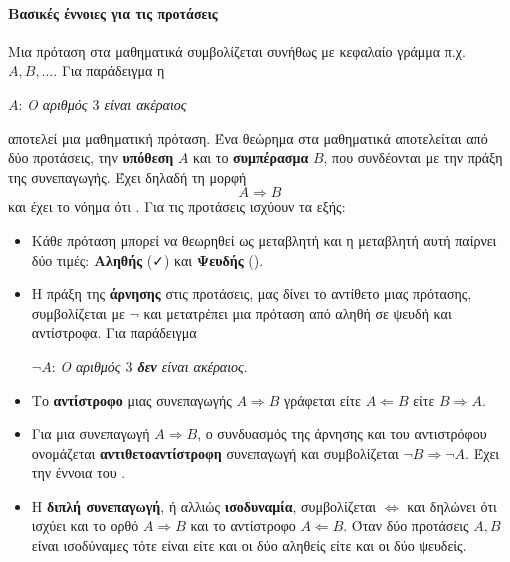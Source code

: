 \documentclass[a4paper,11pt,twoside]{article}
\begin{document}
\paragraph{Βασικές έννοιες για τις προτάσεις}
Μια πρόταση στα μαθηματικά συμβολίζεται συνήθως με κεφαλαίο γράμμα π.χ. $A,B,\ldots$. Για παράδειγμα η 
\begin{center}
$A$: \textit{Ο αριθμός $3$ είναι ακέραιος}
\end{center}
αποτελεί μια μαθηματική πρόταση. Ένα θεώρημα στα μαθηματικά αποτελείται από δύο προτάσεις, την \textbf{υπόθεση} $A$ και το \textbf{συμπέρασμα} $B$, που συνδέονται με την πράξη της συνεπαγωγής. Έχει δηλαδή τη μορφή
\[ A\Rightarrow B \]
και έχει το νόημα ότι . Για τις προτάσεις ισχύουν τα εξής:
\begin{itemize}
\item Κάθε πρόταση μπορεί να θεωρηθεί ως μεταβλητή και η μεταβλητή αυτή παίρνει δύο τιμές: \textbf{Αληθής} (\textcolor{check}{\faCheck}) και \textbf{Ψευδής} (\textcolor{error}{\faTimes}).
\item Η πράξη της \textbf{άρνησης} στις προτάσεις, μας δίνει το αντίθετο μιας πρότασης, συμβολίζεται με $\neg$ και μετατρέπει μια πρόταση από αληθή σε ψευδή και αντίστροφα. Για παράδειγμα 
\begin{center}
$\neg A$: \textit{Ο αριθμός $3$ \textbf{δεν} είναι ακέραιος}.
\end{center}
\item Το \textbf{αντίστροφο} μιας συνεπαγωγής $A\Rightarrow B$ γράφεται είτε $A\Leftarrow B$ είτε $B\Rightarrow A$.
\item Για μια συνεπαγωγή $A\Rightarrow B$, ο συνδυασμός της άρνησης και του αντιστρόφου ονομάζεται \textbf{αντιθετοαντίστροφη} συνεπαγωγή και συμβολίζεται $\neg B\Rightarrow\neg A$. Έχει την έννοια του .
\item Η \textbf{διπλή συνεπαγωγή}, ή αλλιώς \textbf{ισοδυναμία}, συμβολίζεται $\Leftrightarrow$ και δηλώνει ότι ισχύει και το ορθό $A\Rightarrow B$ και το αντίστροφο $A\Leftarrow B$. Όταν δύο προτάσεις $A,B$ είναι ισοδύναμες τότε είναι είτε και οι δύο αληθείς είτε και οι δύο ψευδείς.
\end{itemize}
\end{document}
